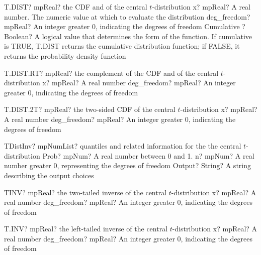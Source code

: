 \documentclass[12pt,a4paper,openany]{book}
\begin{document}
\begin{mpFunctionsExtract}
\mpWorksheetFunctionThreeNotImplemented
{T.DIST? mpReal? the CDF and of the central $t$-distribution}
{x? mpReal? A real number. The numeric value at which to evaluate the distribution}
{deg\_freedom? mpReal? An integer  greater 0, indicating the degrees of freedom}
{Cumulative ? Boolean? A logical value that determines the form of the function. If cumulative is TRUE, T.DIST returns the cumulative distribution function; if FALSE, it returns the probability density function}
\end{mpFunctionsExtract}

\begin{mpFunctionsExtract}
\mpWorksheetFunctionTwoNotImplemented
{T.DIST.RT? mpReal? the complement of the CDF and of the central $t$-distribution}
{x? mpReal? A real number}
{deg\_freedom? mpReal? An integer  greater 0, indicating the degrees of freedom}
\end{mpFunctionsExtract}

\begin{mpFunctionsExtract}
\mpWorksheetFunctionTwoNotImplemented
{T.DIST.2T? mpReal? the two-sided CDF of the central $t$-distribution}
{x? mpReal? A real number}
{deg\_freedom? mpReal? An integer  greater 0, indicating the degrees of freedom}
\end{mpFunctionsExtract}

\begin{mpFunctionsExtract}
\mpFunctionThreeNotImplemented
{TDistInv? mpNumList? quantiles and related information for the the central $t$-distribution}
{Prob? mpNum? A real number between 0 and 1.}
{n? mpNum? A real number greater 0, representing the degrees of freedom}
{Output? String? A string describing the output choices}
\end{mpFunctionsExtract}

\begin{mpFunctionsExtract}
\mpWorksheetFunctionTwoNotImplemented
{TINV? mpReal? the two-tailed inverse of the central $t$-distribution}
{x? mpReal? A real number}
{deg\_freedom? mpReal? An integer  greater 0, indicating the degrees of freedom}
\end{mpFunctionsExtract}

\begin{mpFunctionsExtract}
\mpWorksheetFunctionTwoNotImplemented
{T.INV? mpReal? the left-tailed inverse of the central $t$-distribution}
{x? mpReal? A real number}
{deg\_freedom? mpReal? An integer  greater 0, indicating the degrees of freedom}
\end{mpFunctionsExtract}
\end{document}
